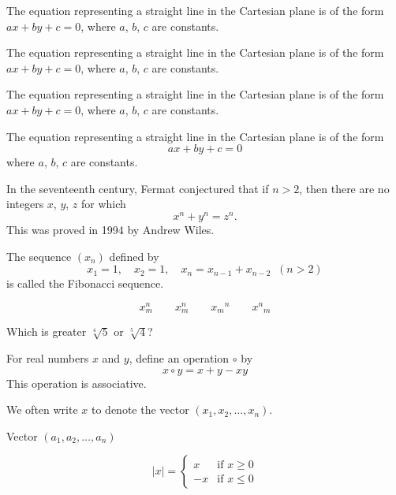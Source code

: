 \documentclass{article}
\begin{document}
The equation representing a straight line in the Cartesian plane
is of the form $ax+by+c=0$, where $a$, $b$, $c$ are constants.

The equation representing a straight line in the Cartesian plane is of
the form \(ax+by+c=0\), where \(a\), \(b\), \(c\) are constants.

The equation representing a straight line in the Cartesian plane is
of the form \begin{math}ax+by+c=0\end{math}, where \begin{math} a
\end{math}, \begin{math} b \end{math}, \begin{math} c \end{math} are
constants.

The equation representing a straight line in the Cartesian plane is
of the form
$$
ax+by+c=0
$$
where $a$, $b$, $c$ are constants.

In the seventeenth century, Fermat conjectured that if $n>2$, then
there are no integers $x$, $y$, $z$ for which
$$
x^n+y^n=z^n.
$$
This was proved in 1994 by Andrew Wiles.

The sequence $(x_n)$ defined by
$$
x_1=1,\quad x_2=1,\quad x_n=x_{n-1}+x_{n-2}\;\;(n>2)
$$
is called the Fibonacci sequence.

$$
x_m^n\qquad x^n_m\qquad {x_m}^n\qquad {x^n}_m
$$

Which is greater $\sqrt[4]{5}$ or $\sqrt[5]{4}$?

For real numbers $x$ and $y$, define an operation $\circ$ by
$$
x\circ y = x+y-xy
$$
This operation is associative.

\newcommand{\vect}{(x_1,x_2,\dots,x_n)}
We often write $x$ to denote the vector $\vect$.

\newcommand{\vectt}[1]{(#1_1,#1_2,\dots,#1_n)}
Vector $\vectt{a}$

\begin{equation*}
|x| =
\begin{cases}
x & \text{if $x\ge 0$}\\
-x & \text{if $x\le 0$}
\end{cases}
\end{equation*}
\end{document}
